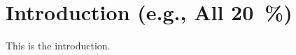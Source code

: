 
\section{Introduction (e.g., All \qty{20}{\percent})}%
\label{sec:Introduction}%

This is the introduction.
